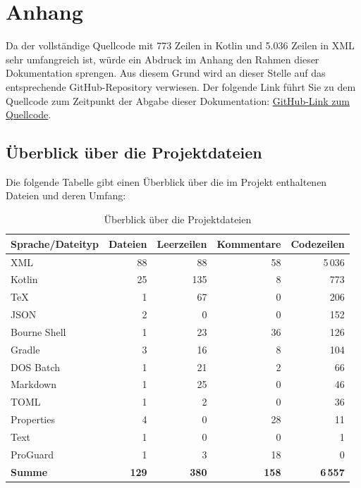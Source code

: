\documentclass[12pt,a4paper]{article}
\begin{document}
\appendix

\section{Anhang}

Da der vollständige Quellcode mit 773 Zeilen in Kotlin und 5.036 Zeilen in XML sehr umfangreich ist, würde ein Abdruck im Anhang den Rahmen dieser Dokumentation sprengen. Aus diesem Grund wird an dieser Stelle auf das entsprechende GitHub-Repository verwiesen. Der folgende Link führt Sie zu dem Quellcode zum Zeitpunkt der Abgabe dieser Dokumentation:  
\href{https://github.com/Erik-Donath/Palabra/tree/cc55c524ebff2f6db85a36f6ec2c0afb23070e2f}{GitHub-Link zum Quellcode}.

\subsection*{Überblick über die Projektdateien}

Die folgende Tabelle gibt einen Überblick über die im Projekt enthaltenen Dateien und deren Umfang:

\begin{table}[htbp]
\centering
\caption{Überblick über die Projektdateien}
\begin{tabularx}{\textwidth}{lrrrr}
\toprule
\textbf{Sprache/Dateityp} & \textbf{Dateien} & \textbf{Leerzeilen} & \textbf{Kommentare} & \textbf{Codezeilen} \\
\midrule
XML            & 88  & 88  & 58  & 5\,036 \\
Kotlin         & 25  & 135 & 8   & 773    \\
TeX            & 1   & 67  & 0   & 206    \\
JSON           & 2   & 0   & 0   & 152    \\
Bourne Shell   & 1   & 23  & 36  & 126    \\
Gradle         & 3   & 16  & 8   & 104    \\
DOS Batch      & 1   & 21  & 2   & 66     \\
Markdown       & 1   & 25  & 0   & 46     \\
TOML           & 1   & 2   & 0   & 36     \\
Properties     & 4   & 0   & 28  & 11     \\
Text           & 1   & 0   & 0   & 1      \\
ProGuard       & 1   & 3   & 18  & 0      \\
\midrule
\textbf{Summe} & \textbf{129} & \textbf{380} & \textbf{158} & \textbf{6\,557} \\
\bottomrule
\end{tabularx}
\end{table}
\end{document}

